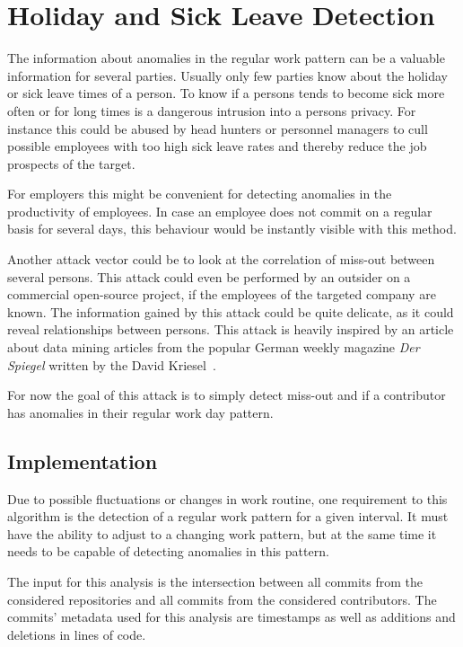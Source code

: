 \section{Holiday and Sick Leave Detection}

The information about anomalies in the regular work pattern can be a valuable information for several parties.
Usually only few parties know about the holiday or sick leave times of a person.
To know if a persons tends to become sick more often or for long times is a dangerous intrusion into a persons privacy.
For instance this could be abused by head hunters or personnel managers to cull possible employees with too high sick leave rates and thereby reduce the job prospects of the target.

For employers this might be convenient for detecting anomalies in the productivity of employees.
In case an employee does not commit on a regular basis for several days, this behaviour would be instantly visible with this method.

Another attack vector could be to look at the correlation of miss-out between several persons.
This attack could even be performed by an outsider on a commercial open-source project, if the employees of the targeted company are known.
The information gained by this attack could be quite delicate, as it could reveal relationships between persons.
This attack is heavily inspired by an article about data mining articles from the popular German weekly magazine \emph{Der Spiegel} written by the David Kriesel~\cite{article:spiegel-mining}.

For now the goal of this attack is to simply detect miss-out and if a contributor has anomalies in their regular work day pattern.


\subsection{Implementation}

Due to possible fluctuations or changes in work routine, one requirement to this algorithm is the detection of a regular work pattern for a given interval.
It must have the ability to adjust to a changing work pattern, but at the same time it needs to be capable of detecting anomalies in this pattern.

The input for this analysis is the intersection between all commits from the considered repositories and all commits from the considered contributors.
The commits' metadata used for this analysis are timestamps as well as additions and deletions in lines of code.

